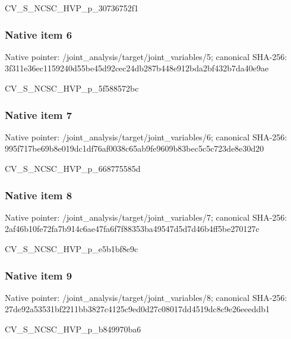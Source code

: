 \documentclass[10pt,a4paper]{article}
\begin{document}
\begingroup\raggedright\sloppy CV\_\allowbreak{}S\_\allowbreak{}NCSC\_\allowbreak{}HVP\_\allowbreak{}p\_\allowbreak{}30736752f1\par\endgroup

\subsubsection{Native item 6}
Native pointer: /joint\_\allowbreak{}analysis/target/joint\_\allowbreak{}variables/5; canonical SHA-256: 3f311e36ec1159240d55be45d92cec24db287b448e912bda2bf432b7da40e9ae

\begingroup\raggedright\sloppy CV\_\allowbreak{}S\_\allowbreak{}NCSC\_\allowbreak{}HVP\_\allowbreak{}p\_\allowbreak{}5f588572bc\par\endgroup

\subsubsection{Native item 7}
Native pointer: /joint\_\allowbreak{}analysis/target/joint\_\allowbreak{}variables/6; canonical SHA-256: 995f717be69b8e019dc1df76af0038c65ab9fe9609b83bec5c5c723de8e30d20

\begingroup\raggedright\sloppy CV\_\allowbreak{}S\_\allowbreak{}NCSC\_\allowbreak{}HVP\_\allowbreak{}p\_\allowbreak{}668775585d\par\endgroup

\subsubsection{Native item 8}
Native pointer: /joint\_\allowbreak{}analysis/target/joint\_\allowbreak{}variables/7; canonical SHA-256: 2af46b10fe72fa7b914c6ae47fa6f7f88353ba49547d5d7d46b4ff5be270127c

\begingroup\raggedright\sloppy CV\_\allowbreak{}S\_\allowbreak{}NCSC\_\allowbreak{}HVP\_\allowbreak{}p\_\allowbreak{}e5b1bf8e9c\par\endgroup

\subsubsection{Native item 9}
Native pointer: /joint\_\allowbreak{}analysis/target/joint\_\allowbreak{}variables/8; canonical SHA-256: 27de92a53531bf2211bb3827c4125c9ed0d27c08017dd4519dc8c9e26eeeddb1

\begingroup\raggedright\sloppy CV\_\allowbreak{}S\_\allowbreak{}NCSC\_\allowbreak{}HVP\_\allowbreak{}p\_\allowbreak{}b849970ba6\par\endgroup
\end{document}
